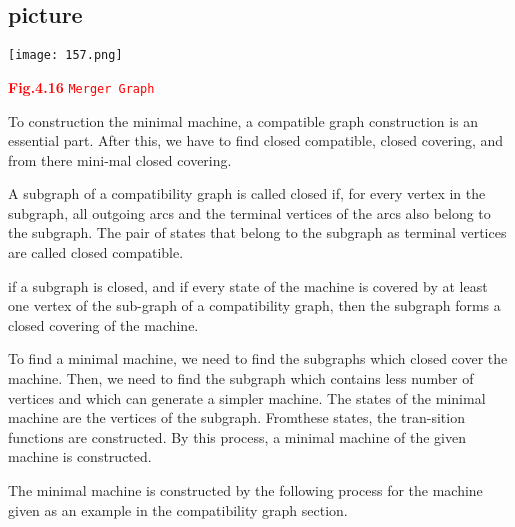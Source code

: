 \documentclass[9pt]{beamer}
\begin{document}
\begin{frame}

\begin{center}
  \section{picture}
\texttt{[image: 157.png]}
\end{center}
\textcolor{red}{\centerline{\textbf{Fig.4.16} \hspace*{0.5cm} \texttt{Merger Graph}}}
\end{frame}

\begin{frame}
\vspace*{1cm}

\vspace*{0.2cm}

\pause
To construction the minimal machine, a compatible graph construction is an essential part. After this, we have to find closed compatible, closed covering, and from there mini-mal closed covering.

\pause

A subgraph of a compatibility graph is called closed if, for every vertex in the subgraph, all outgoing arcs and the terminal vertices of the arcs also belong to the subgraph. The pair of states that belong to the subgraph as terminal vertices are called closed compatible.
\end{frame}

\begin{frame}

if a subgraph is closed, and if every state of the machine is covered by at least one vertex of the sub-graph of a compatibility graph, then the subgraph forms a closed covering of the machine.

\pause

To find a minimal machine, we need to find the subgraphs which closed cover the machine. Then, we need to find the subgraph which contains less number of vertices and which can generate a simpler machine. The states of the minimal machine are the vertices of the subgraph. Fromthese states, the tran-sition functions are constructed. By this process, a minimal machine of the given machine is constructed.

\pause

The minimal machine is constructed by the following process for the machine given as an example in the compatibility graph section.
\vspace*{0.5cm}

\end{frame}
\end{document}
